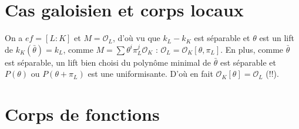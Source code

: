 \documentclass[a4paper,12pt]{book}
\newcommand{\Or}{\mathcal{O}}
\theoremstyle{plain}
\theoremstyle{definition}
\theoremstyle{remark}
\begin{document}
\section{Cas galoisien et corps locaux}
On a $ef=[L:K]$ et $M=\Or_L$, d'où vu que $k_L-k_K$ est séparable
et $\theta$ est un lift de $k_K(\bar \theta)=k_L$, comme 
$M=\sum \theta^i\pi_L^j\Or_K$ : $\Or_L=\Or_K[\theta,\pi_L]$.
En plus, comme $\bar \theta$ est séparable, un lift bien choisi 
du polynôme minimal de $\bar\theta$ est séparable et
$P(\theta)$ ou $P(\theta+\pi_L)$ est une uniformisante. D'où
en fait $\Or_K[\theta]=\Or_L$ (!!).

\section{Corps de fonctions}
\end{document}
